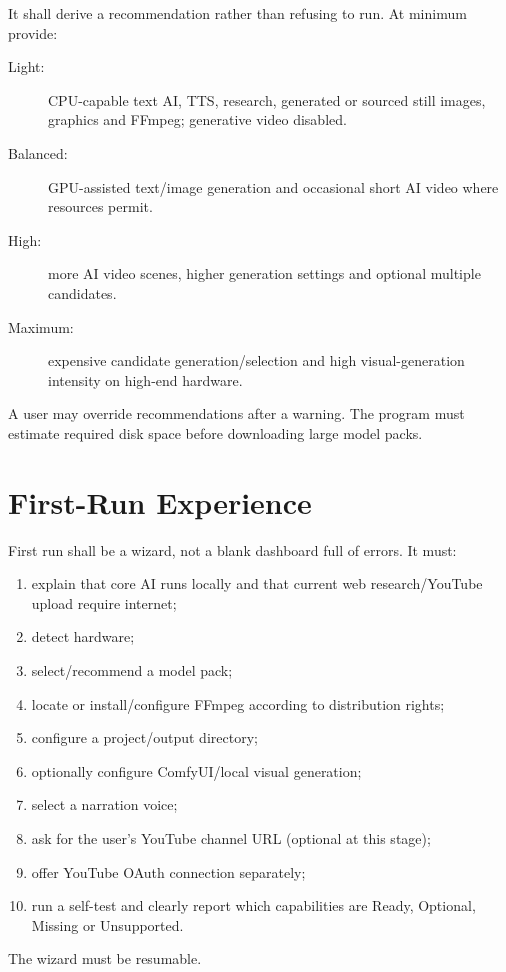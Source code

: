 \documentclass[10pt,journal,compsoc]{IEEEtran}
\begin{document}
It shall derive a recommendation rather than refusing to run. At minimum provide:
\begin{description}
    \item[Light:] CPU-capable text AI, TTS, research, generated or sourced still images, graphics and FFmpeg; generative video disabled.
    \item[Balanced:] GPU-assisted text/image generation and occasional short AI video where resources permit.
    \item[High:] more AI video scenes, higher generation settings and optional multiple candidates.
    \item[Maximum:] expensive candidate generation/selection and high visual-generation intensity on high-end hardware.
\end{description}

A user may override recommendations after a warning. The program must estimate required disk space before downloading large model packs.

\section{First-Run Experience}

First run shall be a wizard, not a blank dashboard full of errors. It must:
\begin{enumerate}
    \item explain that core AI runs locally and that current web research/YouTube upload require internet;
    \item detect hardware;
    \item select/recommend a model pack;
    \item locate or install/configure FFmpeg according to distribution rights;
    \item configure a project/output directory;
    \item optionally configure ComfyUI/local visual generation;
    \item select a narration voice;
    \item ask for the user's YouTube channel URL (optional at this stage);
    \item offer YouTube OAuth connection separately;
    \item run a self-test and clearly report which capabilities are Ready, Optional, Missing or Unsupported.
\end{enumerate}

The wizard must be resumable.
\end{document}
